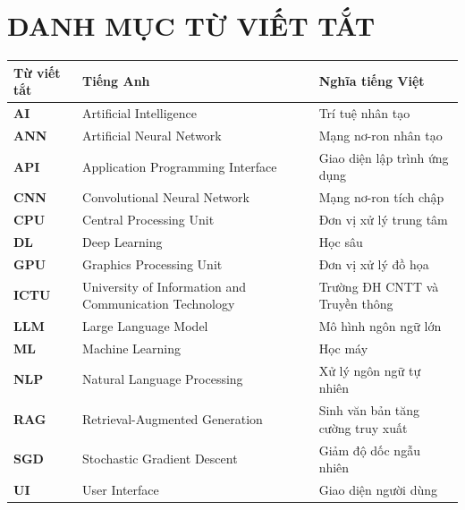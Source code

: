 
\chapter*{DANH MỤC TỪ VIẾT TẮT}


\begin{table}[htbp]
\centering
\begin{tabularx}{\textwidth}{l p{7.5cm} >{\raggedright\arraybackslash}X}
    \toprule
    \textbf{Từ viết tắt} & \textbf{Tiếng Anh} & \textbf{Nghĩa tiếng Việt} \\
    \midrule
    \textbf{AI}   & Artificial Intelligence           & Trí tuệ nhân tạo \\
    \textbf{ANN}  & Artificial Neural Network         & Mạng nơ-ron nhân tạo \\
    \textbf{API}  & Application Programming Interface & Giao diện lập trình ứng dụng \\
    \textbf{CNN}  & Convolutional Neural Network      & Mạng nơ-ron tích chập \\
    \textbf{CPU}  & Central Processing Unit           & Đơn vị xử lý trung tâm \\
    \textbf{DL}   & Deep Learning                     & Học sâu \\
    \textbf{GPU}  & Graphics Processing Unit          & Đơn vị xử lý đồ họa \\
    \textbf{ICTU} & University of Information and Communication Technology & Trường ĐH CNTT và Truyền thông \\
    \textbf{LLM}  & Large Language Model              & Mô hình ngôn ngữ lớn \\
    \textbf{ML}   & Machine Learning                  & Học máy \\
    \textbf{NLP}  & Natural Language Processing       & Xử lý ngôn ngữ tự nhiên \\
    \textbf{RAG}  & Retrieval-Augmented Generation    & Sinh văn bản tăng cường truy xuất \\
    \textbf{SGD}  & Stochastic Gradient Descent       & Giảm độ dốc ngẫu nhiên \\
    \textbf{UI}   & User Interface                    & Giao diện người dùng \\
    \bottomrule
\end{tabularx}
\end{table}

\clearpage
